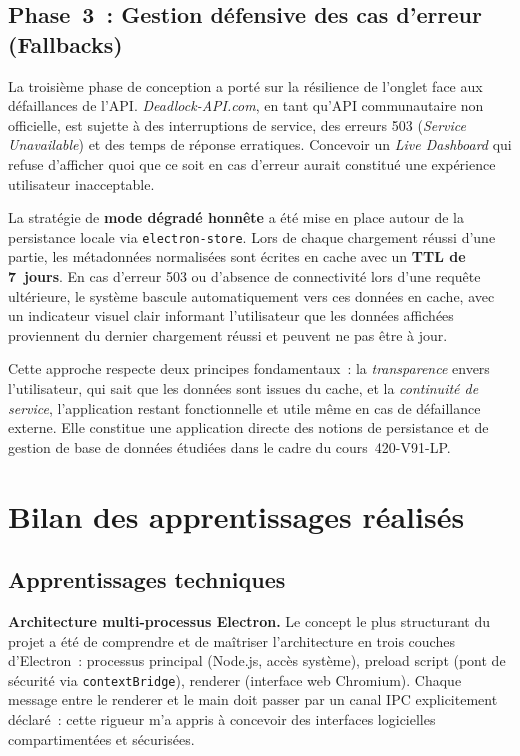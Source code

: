 \documentclass[12pt,a4paper]{article}
\begin{document}
\subsection{Phase~3~: Gestion défensive des cas d'erreur (Fallbacks)}

La troisième phase de conception a porté sur la résilience de l'onglet face aux défaillances de l'API. \textit{Deadlock-API.com}, en tant qu'API communautaire non officielle, est sujette à des interruptions de service, des erreurs 503 (\textit{Service Unavailable}) et des temps de réponse erratiques. Concevoir un \textit{Live Dashboard} qui refuse d'afficher quoi que ce soit en cas d'erreur aurait constitué une expérience utilisateur inacceptable.

La stratégie de \textbf{mode dégradé honnête} a été mise en place autour de la persistance locale via \texttt{electron-store}. Lors de chaque chargement réussi d'une partie, les métadonnées normalisées sont écrites en cache avec un \textbf{TTL de 7~jours}. En cas d'erreur 503 ou d'absence de connectivité lors d'une requête ultérieure, le système bascule automatiquement vers ces données en cache, avec un indicateur visuel clair informant l'utilisateur que les données affichées proviennent du dernier chargement réussi et peuvent ne pas être à jour.

Cette approche respecte deux principes fondamentaux~: la \textit{transparence} envers l'utilisateur, qui sait que les données sont issues du cache, et la \textit{continuité de service}, l'application restant fonctionnelle et utile même en cas de défaillance externe. Elle constitue une application directe des notions de persistance et de gestion de base de données étudiées dans le cadre du cours~420-V91-LP.

\section{Bilan des apprentissages réalisés}

\subsection{Apprentissages techniques}

\textbf{Architecture multi-processus Electron.}
Le concept le plus structurant du projet a été de comprendre et de
maîtriser l'architecture en trois couches d'Electron~: processus principal
(Node.js, accès système), preload script (pont de sécurité via
\texttt{contextBridge}), renderer (interface web Chromium). Chaque
message entre le renderer et le main doit passer par un canal IPC
explicitement déclaré~: cette rigueur m'a appris à concevoir des
interfaces logicielles compartimentées et sécurisées.
\end{document}
